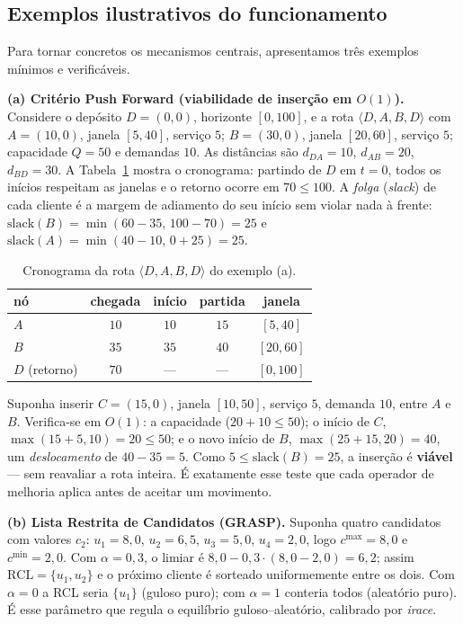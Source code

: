 \documentclass[12pt, a4paper]{article}
\begin{document}
\subsection{Exemplos ilustrativos do funcionamento}\label{sec:exemplos}
Para tornar concretos os mecanismos centrais, apresentamos três exemplos mínimos e verificáveis.

\textbf{(a) Critério Push Forward (viabilidade de inserção em $O(1)$).} Considere o depósito $D=(0,0)$, horizonte $[0,100]$, e a rota $\langle D, A, B, D\rangle$ com $A=(10,0)$, janela $[5,40]$, serviço $5$; $B=(30,0)$, janela $[20,60]$, serviço $5$; capacidade $Q=50$ e demandas $10$. As distâncias são $d_{DA}=10$, $d_{AB}=20$, $d_{BD}=30$. A Tabela~\ref{tab:pf} mostra o cronograma: partindo de $D$ em $t=0$, todos os inícios respeitam as janelas e o retorno ocorre em $70\le 100$. A \emph{folga} (\textit{slack}) de cada cliente é a margem de adiamento do seu início sem violar nada à frente: $\mathrm{slack}(B)=\min(60-35,\,100-70)=25$ e $\mathrm{slack}(A)=\min(40-10,\,0+25)=25$.

\begin{table}[H]
\centering
\caption{Cronograma da rota $\langle D,A,B,D\rangle$ do exemplo (a).}\label{tab:pf}
\begin{tabular}{lcccc}
\toprule
nó & chegada & início & partida & janela \\
\midrule
$A$ & $10$ & $10$ & $15$ & $[5,40]$ \\
$B$ & $35$ & $35$ & $40$ & $[20,60]$ \\
$D$ (retorno) & $70$ & --- & --- & $[0,100]$ \\
\bottomrule
\end{tabular}
\end{table}

Suponha inserir $C=(15,0)$, janela $[10,50]$, serviço $5$, demanda $10$, entre $A$ e $B$. Verifica-se em $O(1)$: a capacidade ($20+10\le 50$); o início de $C$, $\max(15+5,10)=20\le 50$; e o novo início de $B$, $\max(25+15,20)=40$, um \emph{deslocamento} de $40-35=5$. Como $5\le \mathrm{slack}(B)=25$, a inserção é \textbf{viável} --- sem reavaliar a rota inteira. É exatamente esse teste que cada operador de melhoria aplica antes de aceitar um movimento.

\textbf{(b) Lista Restrita de Candidatos (GRASP).} Suponha quatro candidatos com valores $c_2$: $u_1{=}8{,}0$, $u_2{=}6{,}5$, $u_3{=}5{,}0$, $u_4{=}2{,}0$, logo $c^{\max}{=}8{,}0$ e $c^{\min}{=}2{,}0$. Com $\alpha=0{,}3$, o limiar é $8{,}0-0{,}3\cdot(8{,}0-2{,}0)=6{,}2$; assim $\mathrm{RCL}=\{u_1,u_2\}$ e o próximo cliente é sorteado uniformemente entre os dois. Com $\alpha=0$ a RCL seria $\{u_1\}$ (guloso puro); com $\alpha=1$ conteria todos (aleatório puro). É esse parâmetro que regula o equilíbrio guloso--aleatório, calibrado por \textit{irace}.
\end{document}
